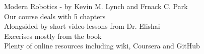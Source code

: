\documentclass[preview]{standalone}
\begin{document}
Modern Robotics - by Kevin M. Lynch and Frnack C. Park\\Our course deals with 5 chapters\\Alongsided by short video lessons from Dr. Elishai\\Excerises mostly from the book\\Plenty of online resources including wiki, Coursera and GitHub\\
\end{document}
